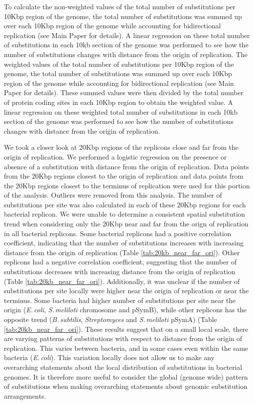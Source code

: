 \documentclass[11pt]{article}
\newcommand{\smel}{\textit{S.\,meliloti}\xspace}
\newcommand{\strep}{\textit{Streptomyces}\xspace}
\newcommand{\ecol}{\textit{E.\,coli}\xspace}
\newcommand{\bass}{\textit{B.\,subtilis}\xspace}
\newcommand{\pa}{pSymA\xspace}
\newcommand{\pb}{pSymB\xspace}
\begin{document}
To calculate the non-weighted values of the total number of substitutions per 10Kbp region of the genome, the total number of substitutions was summed up over each 10Kbp region of the genome while accounting for bidirectional replication (see Main Paper for details).
A linear regression on these total number of substitutions in each 10kb section of the genome was performed to see how the number of substitutions changes with distance from the origin of replication.
The weighted values of the total number of substitutions per 10Kbp region of the genome, the total number of substitutions was summed up over each 10Kbp region of the genome while accounting for bidirectional replication (see Main Paper for details).
These summed values were then divided by the total number of protein coding sites in each 10Kbp region to obtain the weighted value.
A linear regression on these weighted total number of substitutions in each 10kb section of the genome was performed to see how the number of substitutions changes with distance from the origin of replication.

We took a closer look at 20Kbp regions of the replicons close and far from the origin of replication.
We performed a logistic regression on the presence or absence of a substitution with distance from the origin of replication.
Data points from the 20Kbp regions closest to the origin of replication and data points from the 20Kbp regions closest to the terminus of replication were used for this portion of the analysis.
Outliers were removed from this analysis.
The number of substitutions per site was also calculated in each of these 20Kbp regions for each bacterial replicon.
We were unable to determine a consistent spatial substitution trend when considering only the 20Kbp near and far from the orign of replication in all bacterial replicons.
Some bacterial replicons had a positive correlation coefficient, indicating that the number of substitutions increases with increasing distance from the origin of replication (Table \ref{tab:20kb_near_far_ori}).
Other replicons had a negative correlation coefficient, suggesting that the number of substitutions decreases with increasing distance from the origin of replication (Table \ref{tab:20kb_near_far_ori}).
Additionally, it was unclear if the number of substitutions per site locally were higher near the origin of replication or near the terminus.
Some bacteria had higher number of substitutions per site near the origin (\ecol, \smel chromosome and \pb), while other replicons has the opposite trend (\bass, \strep and \smel \pa) (Table \ref{tab:20kb_near_far_ori}).
These results suggest that on a small local scale, there are varying patterns of substitutions with respect to distance from the origin of replication.
This varies between bacteria, and in some cases even within the same bacteria (\ecol).
This variation locally does not allow us to make any overarching statements about the local distribution of substitutions in bacterial genomes.
It is therefore more useful to consider the global (genome wide) pattern of substitutions when making overarching statements about genomic substitution arrangements.
\end{document}
